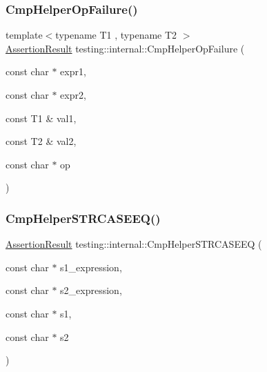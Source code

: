 \subsubsection{\texorpdfstring{Cmp\+Helper\+Op\+Failure()}{CmpHelperOpFailure()}}
{\footnotesize\ttfamily template$<$typename T1 , typename T2 $>$ \\
\hyperlink{classtesting_1_1_assertion_result}{Assertion\+Result} testing\+::internal\+::\+Cmp\+Helper\+Op\+Failure (\begin{DoxyParamCaption}\item[{const char $\ast$}]{expr1,  }\item[{const char $\ast$}]{expr2,  }\item[{const T1 \&}]{val1,  }\item[{const T2 \&}]{val2,  }\item[{const char $\ast$}]{op }\end{DoxyParamCaption})}

\mbox{\label{namespacetesting_1_1internal_a30dfeb01f1bc8087c7d05205d5fa75c1}} 
\subsubsection{\texorpdfstring{Cmp\+Helper\+S\+T\+R\+C\+A\+S\+E\+E\+Q()}{CmpHelperSTRCASEEQ()}}
{\footnotesize\ttfamily \hyperlink{classtesting_1_1_assertion_result}{Assertion\+Result} testing\+::internal\+::\+Cmp\+Helper\+S\+T\+R\+C\+A\+S\+E\+EQ (\begin{DoxyParamCaption}\item[{const char $\ast$}]{s1\+\_\+expression,  }\item[{const char $\ast$}]{s2\+\_\+expression,  }\item[{const char $\ast$}]{s1,  }\item[{const char $\ast$}]{s2 }\end{DoxyParamCaption})}

\mbox{\label{namespacetesting_1_1internal_a7e31d489f06ab8f6a81a7729f0c377e7}} 
